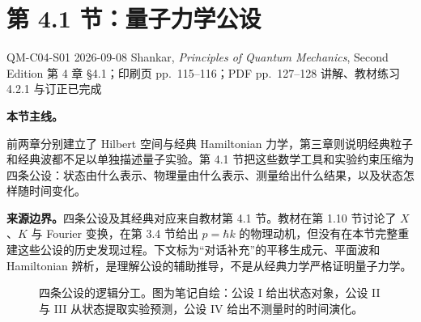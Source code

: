 
\section{第 4.1 节：量子力学公设}
\label{section:QM-C04-S01}

\studymeta
  {QM-C04-S01}
  {2026-09-08}
  {Shankar, \textit{Principles of Quantum Mechanics}, Second Edition}
  {第 4 章 \S 4.1；印刷页 pp.~115--116；PDF pp.~127--128}
  {讲解、教材练习 4.2.1 与订正已完成}

\textbf{本节主线。}

前两章分别建立了 Hilbert 空间与经典 Hamiltonian 力学，第三章则说明经典粒子和经典波都不足以单独描述量子实验。第 4.1 节把这些数学工具和实验约束压缩为四条公设：状态由什么表示、物理量由什么表示、测量给出什么结果，以及状态怎样随时间变化。

\textbf{来源边界。}四条公设及其经典对应来自教材第 4.1 节。教材在第 1.10 节讨论了 $X$、$K$ 与 Fourier 变换，在第 3.4 节给出 $p=\hbar k$ 的物理动机，但没有在本节完整重建这些公设的历史发现过程。下文标为“对话补充”的平移生成元、平面波和 Hamiltonian 辨析，是理解公设的辅助推导，不是从经典力学严格证明量子力学。

\begin{figure}[htbp]
  \centering
  \caption{四条公设的逻辑分工。图为笔记自绘：公设 I 给出状态对象，公设 II 与 III 从状态提取实验预测，公设 IV 给出不测量时的时间演化。}
  \label{fig:QM-C04-S01-four-postulates}
\end{figure}

